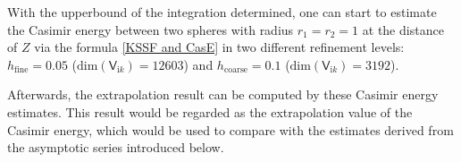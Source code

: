  

With the upperbound of the integration determined, one can start to estimate the Casimir energy between two spheres with radius $r_1 = r_2 = 1$ at the 
distance of $Z$ via the formula \eqref{KSSF and CasE} in two different refinement levels: $h_{\text{fine}} = 0.05$ 
($\text{dim}(\mathsf{V}_{\mathrm{i}k}) = 12603$) and $h_{\text{coarse}} = 0.1$ ($\text{dim}(\mathsf{V}_{\mathrm{i}k}) = 3192$).

Afterwards, the extrapolation result can be computed by these Casimir energy estimates. This result would be regarded as the extrapolation value of the 
Casimir energy, which would be used to compare with the 
estimates derived from the asymptotic series introduced below. 

